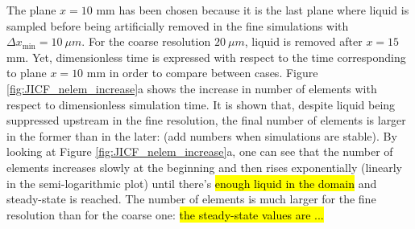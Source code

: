 The plane $x = 10$ mm has been chosen because it is the last plane where liquid is sampled before being artificially removed in the fine simulations with $\Delta x_\mathrm{min} = 10 ~\mu m$. For the coarse resolution $20 ~\mu m$, liquid is removed after $x = 15$ mm. Yet, dimensionless time is expressed with respect to the time corresponding to plane $x = 10$ mm in order to compare between cases. Figure \ref{fig:JICF_nelem_increase}a shows the increase in number of elements with respect to dimensionless simulation time. It is shown that, despite liquid being suppressed upstream in the fine resolution, the final number of elements is larger in the former than in the later: (add numbers when simulations are stable). By looking at Figure \ref{fig:JICF_nelem_increase}a, one can see that the number of elements increases slowly at the beginning and then rises exponentially (linearly in the semi-logarithmic plot) until there’s \hl{enough liquid in the domain} and steady-state is reached. The number of elements is much larger for the fine resolution than for the coarse one: \hl{the steady-state values are ... }

